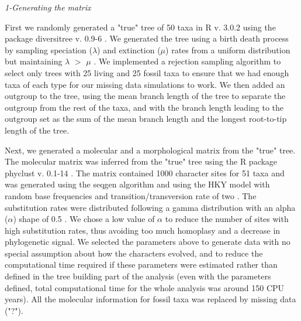 \documentclass[12pt,letterpaper]{article}
\renewcommand{\subsection}[1]{%
\bigskip
\begin{center}
\begin{large}
\normalfont\itshape #1
\end{large}
\end{center}}
\begin{document}

\subsection{1-Generating the matrix}
First we randomly generated a "true" tree of 50 taxa in R v. 3.0.2 \citep{R302} using the package diversitree v. 0.9-6 \citep{fitzjohndiversitree2012}. We generated the tree using a birth death process by sampling speciation ($\lambda$) and extinction ($\mu$) rates from a uniform distribution but maintaining $\lambda$ $>$ $\mu$ \citep{paradistime-dependent2011}. We implemented a rejection sampling algorithm to select only trees with 25 living and 25 fossil taxa to ensure that we had enough taxa of each type for our missing data simulations to work. We then added an outgroup to the tree, using the mean branch length of the tree to separate the outgroup from the rest of the taxa, and with the branch length leading to the outgroup set as the sum of the mean branch length and the longest root-to-tip length of the tree.

Next, we generated a molecular and a morphological matrix from the "true" tree. The molecular matrix was inferred from the "true" tree using the R package phyclust v. 0.1-14 \citep{chen2011}. The matrix contained 1000 character sites for 51 taxa and was generated using the seqgen algorithm \citep{ranbaut1997seqgen} and using the HKY model \citep{HKY85} with random base frequencies and transition/transversion rate of two \citep{douadycomparison2003}. The substitution rates were distributed following a gamma distribution with an alpha ($\alpha$) shape of 0.5 \citep{yangamong-site1996}. We chose a low value of $\alpha$ to reduce the number of sites with high substitution rates, thus avoiding too much homoplasy and a decrease in phylogenetic signal. We selected the parameters above to generate data with no special assumption about how the characters evolved, and to reduce the computational time required if these parameters were estimated rather than defined in the tree building part of the analysis (even with the parameters defined, total computational time for the whole analysis was around 150 CPU years). All the molecular information for fossil taxa was replaced by missing data ("?").
\end{document}

